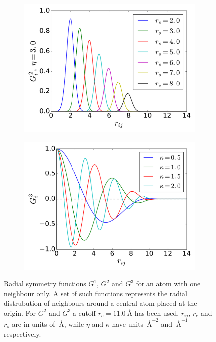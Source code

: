 \documentclass[twoside,english]{uiofysmaster}
\begin{document}
\begin{figure}
\begin{subfigure}{0.5\linewidth}
    \label{fig:radialSymmetriFunctions:b} 
  \end{subfigure} 
  \begin{subfigure}{0.5\linewidth}
    \centering
    \includegraphics[width=\linewidth]{Figures/Theory/G2_2.pdf} 
    \label{fig:radialSymmetriFunctions:c} 
  \end{subfigure}%
  \begin{subfigure}{0.5\linewidth}
    \centering
    \includegraphics[width=\linewidth]{Figures/Theory/G3.pdf} 
    \label{fig:radialSymmetriFunctions:d} 
  \end{subfigure} 
  \vspace{-1.5ex}
  \caption{Radial symmetry functions $G^1$, $G^2$ and $G^3$ for an atom with one neighbour only. A set of such 
	   functions represents the radial distrubution of neighbours around a central atom placed at the origin.
	   For $G^2$ and $G^3$ a cutoff $r_c = \SI{11.0}{\angstrom}$ has been used. $r_{ij}$, $r_c$ and $r_s$ are in 
	   units of $\SI{}{\angstrom}$, while $\eta$ and $\kappa$ have units $\SI{}{\angstrom}^{-2}$ and 
	   $\SI{}{\angstrom}^{-1}$ respectively.}
  \label{fig:radialSymmetriFunctions} 
  \vspace{-1.5ex}
\end{figure}
\end{document}
